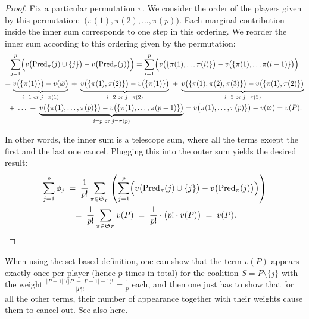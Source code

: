 {\begin{enumerate}
\begin{proof}
        Fix a particular permutation $\pi$. 
        We consider the order of the players given by this permutation:~$\bigl(\pi(1), \pi(2), \dots, \pi(p)\bigr)$.
        Each marginal contribution inside the inner sum corresponds to one step in this ordering.
        We reorder the inner sum according to this ordering given by the permutation:
        \begin{multline*}
            \sum_{j=1}^p \Bigl( v\bigl( \mathrm{Pred}_\pi(j) \cup \{j\} \bigr)
                - v\bigl( \mathrm{Pred}_\pi(j) \bigr) \Bigr)
            = \sum_{i=1}^p \Bigl( v\bigl( \{ \pi(1), \dots \pi(i) \} \bigr)
                - v\bigl( \{ \pi(1), \dots \pi(i-1) \} \bigr) \Bigr) \\
            = \underbrace{v \bigl( \{ \pi(1) \} \bigr) - v(\varnothing)}_{i=1 \text{ or } j = \pi(1)}
                \;+\; \underbrace{v \bigl( \{ \pi(1), \pi(2) \} \bigr) - v \bigl( \{ \pi(1) \} \bigr)}_{i=2 \text{ or } j = \pi(2)}
                \;+\; \underbrace{v \bigl( \{ \pi(1), \pi(2), \pi(3) \} \bigr) - v \bigl( \{ \pi(1), \pi(2) \} \bigr)}_{i=3 \text{ or } j = \pi(3)} \\
                \;+\; \dots 
                \;+\; \underbrace{v \bigl( \{ \pi(1), \ldots, \pi(p) \} \bigr) - v \bigl( \{ \pi(1), \ldots, \pi(p - 1) \} \bigr)}_{i=p \text{ or } j = \pi(p)} 
            = v \bigl( \pi(1), \ldots, \pi(p) \} \bigr) - v(\varnothing)
            = v (P).
        \end{multline*}

        In other words, the inner sum is a telescope sum, where all the terms except the first and the last one cancel.
        Plugging this into the outer sum yields the desired result:
        \begin{gather*}
            \sum_{j=1}^p \phi_j 
            \;=\; \frac{1}{p!} \sum_{\pi \in \mathfrak{S}_P} \left( \sum_{j=1}^p \Bigl(
                v\bigl( \mathrm{Pred}_\pi(j) \cup \{j\} \bigr)
                - v\bigl( \mathrm{Pred}_\pi(j) \bigr)
            \Bigr) \right) \\
            \;=\; \frac{1}{p!} \sum_{\pi \in \mathfrak{S}_P} v(P)
            \;=\; \frac{1}{p!} \cdot \bigl(p! \cdot v(P)\bigr)
            \;=\; v(P) .
        \end{gather*}
        
    \end{proof}

    When using the set-based definition, one can show that the term $v(P)$ appears exactly once per player (hence $p$ times in total) for the coalition $S = P \setminus \{j\}$ with the weight $\frac{|P - 1|! \, \bigl(|P| - |P - 1| - 1\bigr)!}{|P|!} = \frac{1}{p}$ each, and then one just has to show that for all the other terms, their number of appearance together with their weights cause them to cancel out.
    See also \href{https://math.stackexchange.com/questions/2747088/shapley-value-is-efficient}{here}.


\end{enumerate}}
